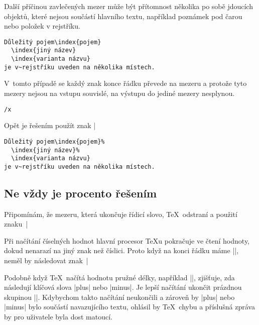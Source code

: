 \documentclass{csbulletin}
\def\p#1{\texttt{\char`\\#1}}
\begin{document}
Další příčinou zavlečených mezer může být přítomnost několika po sobě jdoucích objektů, které nejsou součástí hlavního textu, například poznámek pod čarou nebo položek v rejstříku.
\begin{Verbatim}
Důležitý pojem\index{pojem}
  \index{jiný název}
  \index{varianta názvu}
je v~rejstříku uveden na několika místech.
\end{Verbatim}
V~tomto případě se každý znak konce řádku převede na mezeru a protože tyto mezery nejsou na vstupu souvislé, na výstupu do jediné mezery nesplynou.
\begingroup
\def\x{\hbox{\rm
Důležitý pojem\index{pojem}\
  \index{jiný název}\
  \index{varianta názvu}\
je v~rejstříku uveden na několika místech.
\unskip}}%
\begin{Verbatim}[commandchars=/()]
/x
\end{Verbatim}
\endgroup
\noindent
Opět je řešením použít znak |%
\begin{Verbatim}
Důležitý pojem\index{pojem}%
  \index{jiný název}%
  \index{varianta názvu}
je v~rejstříku uveden na několika místech.
\end{Verbatim}

\subsection{Ne vždy je procento řešením}

Připomínám, že mezeru, která ukončuje řídicí slovo, \TeX\ odstraní a použití znaku~|%

Při načítání číselných hodnot hlavní procesor \TeX u pokračuje ve čtení hodnoty, dokud nenarazí na jiný znak než číslici. Proto když na konci řádku máme ||, neměl by následovat znak~|%

Podobně když \TeX\ načítá hodnotu pružné délky, například |\parskip=2pc|, zjišťuje, zda následují klíčová slova |plus| nebo |minus|. Je lepší načítání ukončit prázdnou skupinou |{}|. Kdybychom takto načítání neukončili a zároveň by |plus| nebo |minus| bylo součástí navazujícího textu, ohlásil by \TeX\ chybu a příslušná zpráva by pro uživatele byla dost matoucí.
\end{document}
